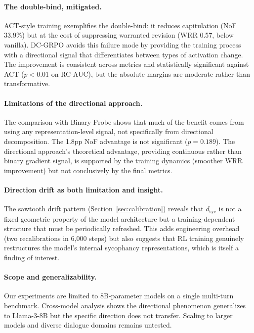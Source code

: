 \documentclass[11pt,a4paper]{article}
\newcommand{\dsyc}{$d_{\mathrm{syc}}$}
\begin{document}
\paragraph{The double-bind, mitigated.} ACT-style training exemplifies the double-bind: it reduces capitulation (NoF 33.9\%) but at the cost of suppressing warranted revision (WRR 0.57, below vanilla). DC-GRPO avoids this failure mode by providing the training process with a directional signal that differentiates between types of activation change. The improvement is consistent across metrics and statistically significant against ACT ($p < 0.01$ on RC-AUC), but the absolute margins are moderate rather than transformative.

\paragraph{Limitations of the directional approach.} The comparison with Binary Probe shows that much of the benefit comes from using any representation-level signal, not specifically from directional decomposition. The 1.8pp NoF advantage is not significant ($p = 0.189$). The directional approach's theoretical advantage, providing continuous rather than binary gradient signal, is supported by the training dynamics (smoother WRR improvement) but not conclusively by the final metrics.

\paragraph{Direction drift as both limitation and insight.} The sawtooth drift pattern (Section~\ref{sec:calibration}) reveals that \dsyc{} is not a fixed geometric property of the model architecture but a training-dependent structure that must be periodically refreshed. This adds engineering overhead (two recalibrations in 6,000 steps) but also suggests that RL training genuinely restructures the model's internal sycophancy representations, which is itself a finding of interest.

\paragraph{Scope and generalizability.} Our experiments are limited to 8B-parameter models on a single multi-turn benchmark. Cross-model analysis shows the directional phenomenon generalizes to Llama-3-8B but the specific direction does not transfer. Scaling to larger models and diverse dialogue domains remains untested.
\end{document}
